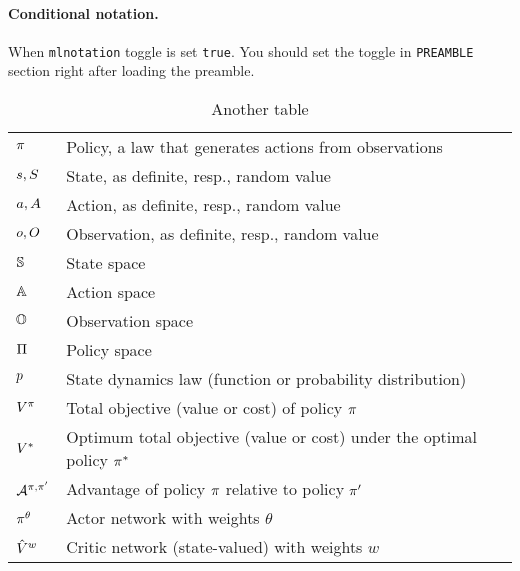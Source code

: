 \documentclass[12pt,twoside]{../../mitthesis}
\begin{document}
\paragraph{Conditional notation.}
When \texttt{mlnotation} toggle is set \texttt{true}.
You should set the toggle in \texttt{PREAMBLE} section right after loading the preamble.
\begin{table}
\caption{Another table}
\label{table:my-another-table}
\begin{tabularx}{0.97\textwidth}{ |p{}|p{}| }  
\hline
$\pi$ & Policy, a law that generates actions from observations \\ 
$s, S$ & State, as definite, resp., random value \\ 
$a, A$ & Action, as definite, resp., random value \\ 
$o, O$ & Observation, as definite, resp., random value \\ 
$\mathbb S$ & State space \\
$\mathbb A$ & Action space \\
$\mathbb O$ & Observation space \\
$\Pi$ & Policy space \\
$p$ & State dynamics law (function or probability distribution) \\ 
$V^\pi$ & Total objective (value or cost) of policy $\pi$ \\
$V^*$ & Optimum total objective (value or cost) under the optimal policy $\pi^*$ \\
$\mathcal A^{\pi,\pi'}$ & Advantage of policy $\pi$ relative to policy $\pi'$ \\
$\pi^\theta$ & Actor network with weights $\theta$ \\
$\hat {V}^w$ & Critic network (state-valued) with weights $w$ \\
\hline
\end{tabularx}

\end{table}
\end{document}
